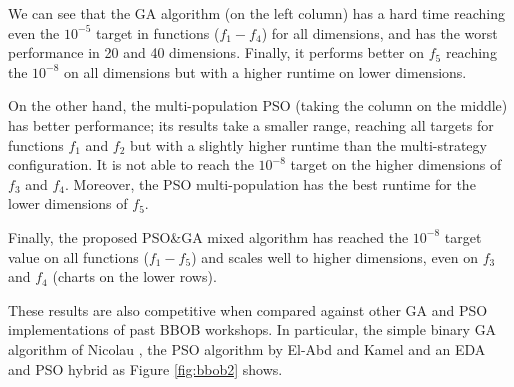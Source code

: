 We can see that the GA algorithm (on the left column) has a hard time reaching even the
$10^{-5}$ target in functions ($f_1-f_4$) for all dimensions, and has the worst
performance in 20 and 40 dimensions. Finally, it performs better on $f_5$
reaching the $10^{-8}$ on all dimensions but with a higher runtime on lower
dimensions.

On the other hand, the multi-population PSO (taking the column on the middle) 
has better performance; its results take a smaller range,
reaching all targets for functions $f_1$ and $f_2$ but with a slightly higher
runtime than the multi-strategy configuration. It is not able to reach the
$10^{-8}$ target on the higher dimensions of $f_3$ and $f_4$. Moreover, the PSO
multi-population has the best runtime for the lower dimensions of $f_5$.

Finally, the proposed PSO\&GA mixed algorithm has reached the $10^{-8}$ target
value on all functions ($f_1-f_5$) and scales well to higher dimensions, even
on $f_3$ and $f_4$ (charts on the lower rows). 

These results are also competitive when compared against other GA and PSO
implementations of past BBOB workshops. In particular, the simple binary GA algorithm
of Nicolau \cite{nicolau2009application}, the PSO algorithm by El-Abd and Kamel \cite{el2009black} 
and an EDA and PSO hybrid \cite{el2009blackHybrid} %
as Figure \ref{fig:bbob2} shows.


